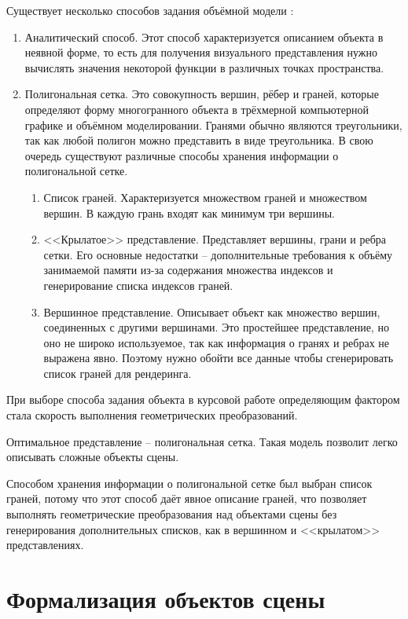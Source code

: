 Существует несколько способов задания объёмной модели \cite{rodgers}:
\begin{enumerate}[label=\arabic*)]
	\item Аналитический способ. Этот способ характеризуется описанием объекта в неявной форме, то есть для получения визуального представления нужно вычислять значения некоторой функции в различных точках пространства.
	\item Полигональная сетка. Это совокупность вершин, рёбер и граней, которые определяют форму многогранного объекта в трёхмерной компьютерной графике и объёмном моделировании. Гранями обычно являются треугольники, так как любой полигон можно представить в виде треугольника.
	В свою очередь существуют различные способы хранения информации о полигональной сетке.
	\begin{enumerate}[label=\arabic*)]
		\item Список граней. Характеризуется множеством граней и множеством вершин. В каждую грань входят как минимум три вершины.
		\item <<Крылатое>> представление. Представляет вершины, грани и ребра сетки. Его основные недостатки -- дополнительные требования к объёму занимаемой памяти из-за содержания множества индексов и генерирование списка индексов граней.
		\item Вершинное представление. Описывает объект как множество вершин, соединенных с другими вершинами. Это простейшее представление, но оно не широко используемое, так как информация о гранях и ребрах не выражена явно. Поэтому нужно обойти все данные чтобы сгенерировать список граней для рендеринга.
	\end{enumerate}
\end{enumerate}

При выборе способа задания объекта в курсовой работе определяющим фактором стала скорость выполнения геометрических преобразований.

Оптимальное представление -- полигональная сетка. Такая модель позволит легко описывать сложные объекты сцены. 

Способом хранения информации о полигональной сетке был выбран список граней, потому что этот способ даёт явное описание граней, что позволяет  выполнять геометрические преобразования над объектами сцены без генерирования дополнительных списков, как в вершинном и <<крылатом>> представлениях.

\section{Формализация объектов сцены}

